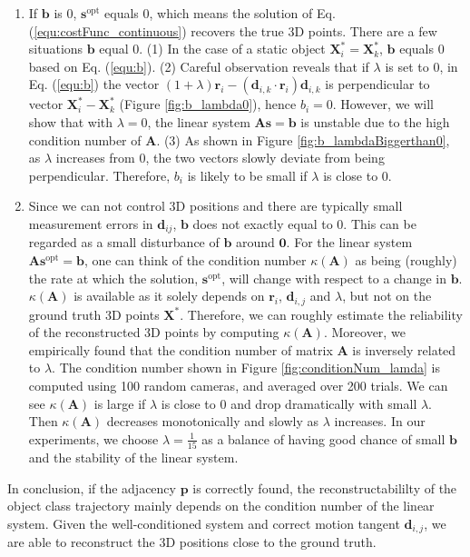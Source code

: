 \begin{enumerate}
\item If $\mathbf{b}$ is 0, $\mathbf{s}^\text{opt}$ equals 0, which means the solution of Eq. (\ref{equ:costFunc_continuous}) recovers the true 3D points. There are a few situations  $\mathbf{b}$ equal 0. (1) In the case of a static object $\mathbf{X}_i^* = \mathbf{X}_k^*$, $\mathbf{b}$ equals 0 based on Eq. (\ref{equ:b}). (2) Careful observation reveals that if $\lambda$ is set to $0$, in Eq. (\ref{equ:b}) the vector $(1+\lambda)\mathbf{r}_i - (\mathbf{d}_{i,k}\cdot \mathbf{r}_i)\mathbf{d}_{i,k}$ is perpendicular to vector $\mathbf{X}_i^*-\mathbf{X}_k^*$ (Figure \ref{fig:b_lambda0}), hence $b_i=0$. However, we will show that with $\lambda=0$, the linear system $\mathbf{A}\mathbf{s}= \mathbf{b}$ is unstable due to the high condition number of $\mathbf{A}$. (3) As shown in Figure \ref{fig:b_lambdaBiggerthan0}, as $\lambda$ increases from 0, the two vectors slowly deviate from being perpendicular. Therefore, $b_i$ is likely to be small if $\lambda$ is close to 0.
\item Since we can not control 3D positions and there are typically small measurement errors in $\mathbf{d}_{ij}$, $\mathbf{b}$ does not exactly equal to 0. This can be regarded as a small disturbance of $\mathbf{b}$ around $\mathbf{0}$. For the linear system $\mathbf{A}\mathbf{s}^\text{opt}= \mathbf{b}$, one can think of the condition number $\kappa(\mathbf A)$ as being (roughly) the rate at which the solution, $\mathbf{s}^{\text{opt}}$, will change with respect to a change in $\mathbf{b}$. $\kappa(\mathbf A)$ is available as it solely depends on $\mathbf{r}_i$, $\mathbf{d}_{i,j}$ and $\lambda$, but not on the ground truth 3D points $\mathbf{X}^*$. Therefore, we can roughly estimate the reliability of the reconstructed 3D points by computing $\kappa(\mathbf A)$. Moreover, we empirically found that the condition number of matrix $\mathbf{A}$ is inversely related to $\lambda$. The condition number shown in Figure \ref{fig:conditionNum_lamda} is computed using 100 random cameras, and averaged over 200 trials. We can see $\kappa(\mathbf A)$ is large if $\lambda$ is close to 0 and drop dramatically with small $\lambda$. Then $\kappa(\mathbf A)$ decreases monotonically and slowly as $\lambda$ increases. In our experiments, we choose $\lambda=\frac{1}{15}$ as a balance of having good chance of small $\mathbf{b}$ and the stability of the linear system.
\end{enumerate}
In conclusion, if the adjacency $\mathbf{p}$ is correctly found, the reconstructabililty of the object class trajectory mainly depends on the condition number of the linear system. Given the well-conditioned system and correct motion tangent $\mathbf{d}_{i,j}$, we are able to reconstruct the 3D positions close to the ground truth.

